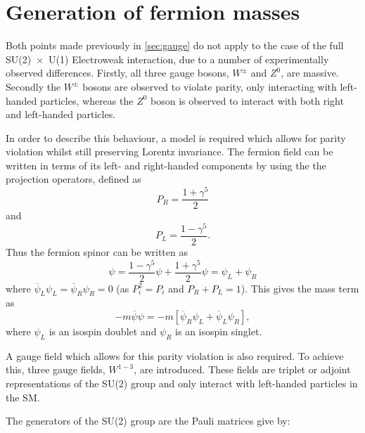 \section{Generation of fermion masses}
\label{secmass}
Both points made previously in \autoref{sec:gauge} do not apply to the case of the full SU(2)~$\times$~U(1) Electroweak interaction, due to a number of experimentally observed differences. Firstly, all three gauge bosons, $W^{\pm}$ and $Z^{0}$, are massive. Secondly the $W^{\pm}$ bosons are observed to violate parity, only interacting with left-handed particles, whereas the $Z^{0}$ boson is observed to interact with both right and left-handed particles. 

In order to describe this behaviour, a model is required which allows for parity violation whilst still preserving Lorentz invariance. The fermion field can be written in terms of its left- and right-handed components by using the the projection operators, defined as
\begin{equation}
  P_{R} = \frac{1+\gamma^{5}}{2}
\end{equation}
and
\begin{equation}
  P_{L} = \frac{1-\gamma^{5}}{2}.
\end{equation}
Thus the fermion spinor can be written as
\begin{equation}
\psi = \frac{1-\gamma^{5}}{2}\psi + \frac{1+\gamma^{5}}{2}\psi = \psi_{L}+\psi_{R}
\label{eq:proj}
\end{equation}
where $\overline{\psi}_{L}\psi_{L} = \overline{\psi}_{R}\psi_{R} = 0$ (as $P_{i}^{2} = P_{i}$ and $P_{R} + P_{L} = 1$). This gives the mass term as
\begin{equation}
   -m\overline{\psi}\psi = -m[\overline{\psi}_{R}\psi_{L} + \overline{\psi}_{L}\psi_{R}],
\end{equation}
where $\psi_{L}$ is an isospin doublet and $\psi_{R}$ is an isospin singlet.

A gauge field which allows for this parity violation is also required.  To achieve this, three gauge fields, $W^{1-3}$, are introduced.  These fields are triplet or adjoint representations of the SU(2) group and only interact with left-handed particles in the SM.

The generators of the SU(2) group are the Pauli matrices give by:

